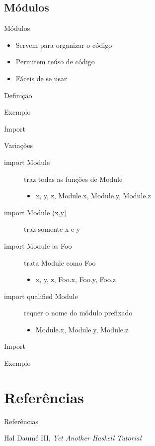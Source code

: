 \documentclass{beamer}
\begin{document}
		\subsection{Módulos}
			\begin{frame}[fragile]{Módulos}
			 \begin{itemize}
			  \item Servem para organizar o código
			  \item Permitem reúso de código
			  \item Fáceis de se usar
			 \end{itemize}
			\end{frame}
			
			\begin{frame}[fragile]{Definição}
			 \begin{block}{Exemplo}
			  
			 \end{block}
			\end{frame}
			
			\begin{frame}[fragile]{Import}
			 \begin{block}{Variações}
			  \begin{description}
			   \item [import Module] traz todas as funções de Module
					\begin{itemize}
					 \item x, y, z, Module.x, Module.y, Module.z
					\end{itemize}
				 \item [import Module (x,y)] traz somente x e y
				 \item [import Module as Foo] trata Module como Foo
					\begin{itemize}
					 \item x, y, z, Foo.x, Foo.y, Foo.z
					\end{itemize}

			   \item [import qualified Module] requer o nome do módulo prefixado
					\begin{itemize}
					 \item Module.x, Module.y, Module.z
					\end{itemize}
			  \end{description}			  
			 \end{block}
			\end{frame}
			
			\begin{frame}[fragile]{Import}
			 \begin{block}{Exemplo}
			  
			 \end{block}
			\end{frame}
			
\section{Referências}
\begin{frame}{Referências}
	\begin{thebibliography}{9}
	 Hal Daumé III, \textit{Yet Another Haskell Tutorial}
	\end{thebibliography}
\end{frame}
	
	
\end{document}
